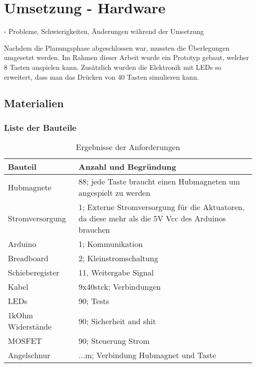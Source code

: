 
\chapter{Umsetzung - Hardware} \label{umsetzungHW}

\nocite{*}
- Probleme, Schwierigkeiten, Änderungen während der Umsetzung

Nachdem die Planungsphase abgeschlossen war, mussten die Überlegungen umgesetzt werden.
Im Rahmen dieser Arbeit wurde ein Prototyp gebaut, welcher 8 Tasten anspielen kann.
Zusätzlich wurden die Elektronik mit LEDs so erweitert, dass man das Drücken von 40 Tasten simulieren kann.

\section{Materialien}
\subsection{Liste der Bauteile}
\begin{table}[htbp]
    \centering
    \begin{tabular}{|m{4cm}|m{8cm}|}
        \hline
        \textbf{Bauteil} &  \textbf{Anzahl und Begründung}  \\
        \hline
        Hubmagnete & 88; jede Taste braucht einen Hubmagneten um angespielt zu werden \\
        \hline
        Stromversorgung & 1; Externe Stromversorgung für die Aktuatoren, da diese mehr als die 5V Vcc des Arduinos brauchen \\
        \hline
        Arduino & 1; Kommunikation \\
        \hline
        Breadboard & 2; Kleinstromschaltung \\
        \hline
        Schieberegister & 11, Weitergabe Signal\\
        \hline
        Kabel & 9x40stck; Verbindungen \\
        \hline
        LEDs & 90; Tests \\
        \hline
        1kOhm Widerstände & 90; Sicherheit and shit \\
        \hline
        MOSFET & 90; Steuerung Strom \\
        \hline
        Angelschnur & ...m; Verbindung Hubmagnet und Taste \\
        \hline
    \end{tabular}
    \caption{Ergebnisse der Anforderungen}
    \label{table:Bauteile}
\end{table}

